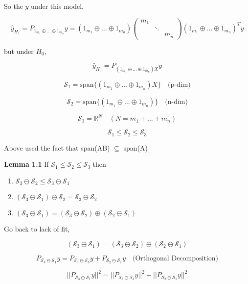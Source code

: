 \documentclass[11pt,fleqn]{book} %
\begin{document}
So the $\hat{y}$ under this model, 

$$\hat{y}_{H_1} = P_{1_{m_1} \oplus \dots \oplus 1_{m_n}} y = (1_{m_1} \oplus \dots \oplus 1_{m_n}) \begin{pmatrix}
	m_1 & & \\
	 & \ddots & \\
	  &  & m_n
\end{pmatrix} (1_{m_1} \oplus \dots \oplus 1_{m_n})^T y$$

but under $H_0$, 

$$ \hat{y}_{H_0} = P_{(1_{m_1} \oplus \dots \oplus 1_{m_n})X} y$$

$$\mathscr{S}_1 = \text{span}\{(1_{m_1} \oplus \dots \oplus 1_{m_n})X \} \quad \text{(p-dim)}$$

$$\mathscr{S}_2 = \text{span}\{(1_{m_1} \oplus \dots \oplus 1_{m_n}) \} \quad \text{(n-dim)}$$

$$\mathscr{S}_3 = \mathbb{R}^N \quad (N = m_1 + \dots + m_n)$$

$$ \mathscr{S}_1 \leq \mathscr{S}_2 \leq \mathscr{S}_3 $$

\begin{remark}
	Above used the fact that span(AB) $\subseteq$ span(A)
\end{remark}

\textbf{Lemma 1.1} If $ \mathscr{S}_1 \leq \mathscr{S}_2 \leq \mathscr{S}_3$ then

\begin{enumerate}
	\item $\mathscr{S}_3 \ominus \mathscr{S}_2 \leq \mathscr{S}_3 \ominus \mathscr{S}_1$		  \item $(\mathscr{S}_3 \ominus \mathscr{S}_1) \ominus \mathscr{S}_2 =  \mathscr{S}_3 \ominus \mathscr{S}_2$
	\item $(\mathscr{S}_3 \ominus \mathscr{S}_1) = (\mathscr{S}_3 \ominus \mathscr{S}_2) \oplus (\mathscr{S}_2 \ominus \mathscr{S}_1)$
 
\end{enumerate}

Go back to lack of fit, 

$$(\mathscr{S}_3 \ominus \mathscr{S}_1) = (\mathscr{S}_3 \ominus \mathscr{S}_2) \oplus (\mathscr{S}_2 \ominus \mathscr{S}_1)$$

$$P_{\mathscr{S}_3 \ominus \mathscr{S}_1}y = P_{\mathscr{S}_3 \ominus \mathscr{S}_3}y + P_{\mathscr{S}_2 \ominus \mathscr{S}_1}y \quad \text{(Orthogonal Decomposition)} $$

$$||P_{\mathscr{S}_3 \ominus \mathscr{S}_1}y||^2 = ||P_{\mathscr{S}_3 \ominus \mathscr{S}_3}y||^2 + ||P_{\mathscr{S}_2 \ominus \mathscr{S}_1}y||^2 $$
\end{document}
